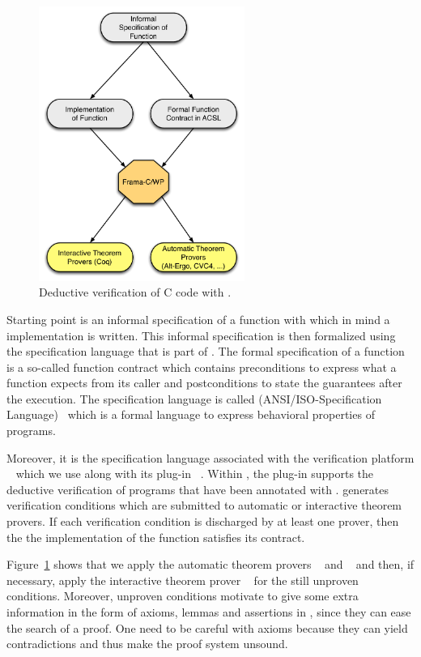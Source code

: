 \begin{figure}[hbt]
\centering
\includegraphics[width=0.60\textwidth]{figures/deductive-verification.pdf}
\caption{\label{fig:method} Deductive verification of C code with \framacwp.}
\end{figure}

Starting point is an informal specification of a function with which in mind
a implementation is written.
This informal specification is then formalized using the
\acsl specification language that is part of \framac.
The formal specification of a function is a so-called function contract
which contains preconditions to express what a function expects from its caller
and postconditions to state the guarantees after the execution.
The specification language is called 
\acsl (ANSI\slash ISO-\isoc Specification Language)~\cite{acsl} 
which is a formal language to express behavioral properties of \isoc programs.

Moreover, it is the specification language associated with 
the verification platform \framac~\cite{FramaC}
which we use along with its plug-in \framacwp~\cite{wp}.
Within \framac, the \wpframac plug-in supports
the deductive verification of \isoc programs that have been annotated with \acsl.
\framacwp generates verification conditions which are submitted to 
automatic or interactive theorem provers.
If each verification condition is discharged by at least one prover, then
the the implementation of the function satisfies its contract.

Figure~\ref{fig:method} shows that we apply the automatic
theorem provers \altergo~\cite{alt-ergo} and \cvc~\cite{cvc}
and then, if necessary, apply the interactive theorem prover \coq~\cite{Coq}
for the still unproven conditions.
Moreover, unproven conditions motivate to give some extra information
in the form of axioms, lemmas and assertions in \acsl, 
since they can ease the search of a proof.
One need to be careful with axioms because they can yield contradictions
and thus make the proof system unsound.

